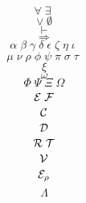 


\begin{Large}
$$\forall\; \exists\; $$
$$\vee \; \emptyset$$
$$\vdash$$
$$\Rightarrow$$
$$\alpha\; \beta\; \gamma\; \delta\; \epsilon\; \zeta\; \eta\; \iota \;$$
$$\mu\; \nu\; \rho \; \phi\; \psi\; \pi\; \sigma\; \tau\; $$
$$\xi$$
$$\omega$$
$$\Phi \; \Psi \; \Xi  \; \Omega$$
$$\cal{E}\; \cal{F}$$
$$\cal{C}$$
$$\cal{D}$$
$$\cal{R}\; \cal{T}$$
$$\cal{V}$$
$$\cal{E}_{\rho}$$
$$\Lambda$$
\end{Large}


